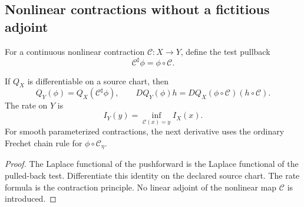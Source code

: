 \subsection{Nonlinear contractions without a fictitious adjoint}

For a continuous nonlinear contraction $\mathcal C:X\to Y$, define the test
pullback
\[
 \mathcal C^\sharp\phi=\phi\circ\mathcal C.
\]

\begin{theorem}
\label{thm:r8-c2-contraction}
If $Q_X$ is differentiable on a source chart, then
\[
 Q_Y(\phi)=Q_X(\mathcal C^\sharp\phi),
 \qquad
 DQ_Y(\phi)h=
 DQ_X(\phi\circ\mathcal C)(h\circ\mathcal C).
\]
The rate on $Y$ is
\[
 I_Y(y)=\inf_{\mathcal C(x)=y}I_X(x).
\]
For smooth parameterized contractions, the next derivative uses the ordinary
Frechet chain rule for $\phi\circ\mathcal C_\eta$.
\end{theorem}

\begin{proof}
The Laplace functional of the pushforward is the Laplace functional of the
pulled-back test.  Differentiate this identity on the declared source chart.
The rate formula is the contraction principle.  No linear adjoint of the
nonlinear map $\mathcal C$ is introduced.
\end{proof}
